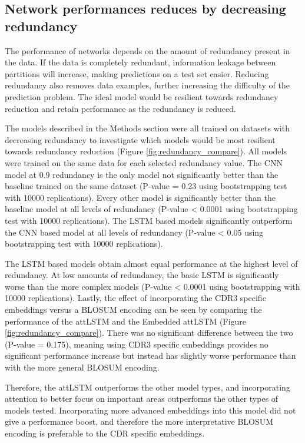 \subsection{Network performances reduces by decreasing redundancy}
The performance of networks depends on the amount of redundancy present in the data. If the data is completely redundant, information leakage between partitions will increase, making predictions on a test set easier. Reducing redundancy also removes data examples, further increasing the difficulty of the prediction problem. The ideal model would be resilient towards redundancy reduction and retain performance as the redundancy is reduced.

The models described in the Methods section were all trained on datasets with decreasing redundancy to investigate which models would be most resilient towards redundancy reduction (Figure \ref{fig:redundancy_compare}). All models were trained on the same data for each selected redundancy value. The CNN model at 0.9 redundancy is the only model not significantly better than the baseline trained on the same dataset (P-value = 0.23 using bootstrapping test with 10000 replications). Every other model is significantly better than the baseline model at all levels of redundancy (P-value < 0.0001 using bootstrapping test with 10000 replications). The LSTM based models significantly outperform the CNN based model at all levels of redundancy (P-value < 0.05 using bootstrapping test with 10000 replications). 

The LSTM based models obtain almost equal performance at the highest level of redundancy. At low amounts of redundancy, the basic LSTM is significantly worse than the more complex models (P-value < 0.0001 using bootstrapping with 10000 replications). Lastly, the effect of incorporating the CDR3 specific embeddings versus a BLOSUM encoding can be seen by comparing the performance of the attLSTM and the Embedded attLSTM (Figure \ref{fig:redundancy_compare}). There was no significant difference between the two (P-value = 0.175), meaning using CDR3 specific embeddings provides no significant performance increase but instead has slightly worse performance than with the more general BLOSUM encoding.

Therefore, the attLSTM outperforms the other model types, and incorporating attention to better focus on important areas outperforms the other types of models tested. Incorporating more advanced embeddings into this model did not give a performance boost, and therefore the more interpretative BLOSUM encoding is preferable to the CDR specific embeddings.


